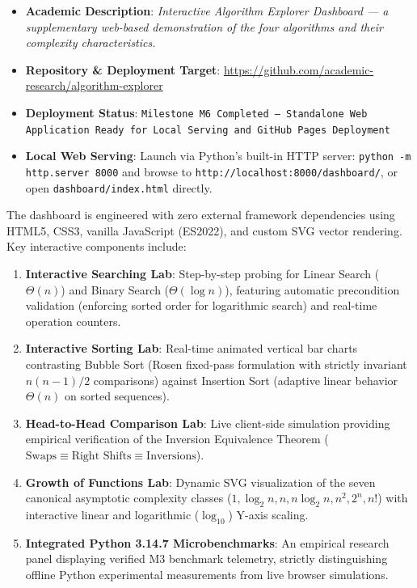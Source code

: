 \documentclass[11pt,a4paper,oneside]{report}
\newcommand{\DocDashboardURL}{https://github.com/academic-research/algorithm-explorer}
\newcommand{\DocDashboardStatus}{Milestone M6 Completed --- Standalone Web Application Ready for Local Serving and GitHub Pages Deployment}
\theoremstyle{definition}
\begin{document}
\begin{itemize}
    \item \textbf{Academic Description}: \emph{Interactive Algorithm Explorer Dashboard --- a supplementary web-based demonstration of the four algorithms and their complexity characteristics.}
    \item \textbf{Repository \& Deployment Target}: \url{\DocDashboardURL}
    \item \textbf{Deployment Status}: \texttt{\DocDashboardStatus}
    \item \textbf{Local Web Serving}: Launch via Python's built-in HTTP server: \texttt{python -m http.server 8000} and browse to \texttt{http://localhost:8000/dashboard/}, or open \texttt{dashboard/index.html} directly.
\end{itemize}

The dashboard is engineered with zero external framework dependencies using HTML5, CSS3, vanilla JavaScript (ES2022), and custom SVG vector rendering. Key interactive components include:
\begin{enumerate}
    \item \textbf{Interactive Searching Lab}: Step-by-step probing for Linear Search ($\Theta(n)$) and Binary Search ($\Theta(\log n)$), featuring automatic precondition validation (enforcing sorted order for logarithmic search) and real-time operation counters.
    \item \textbf{Interactive Sorting Lab}: Real-time animated vertical bar charts contrasting Bubble Sort (Rosen fixed-pass formulation with strictly invariant $n(n-1)/2$ comparisons) against Insertion Sort (adaptive linear behavior $\Theta(n)$ on sorted sequences).
    \item \textbf{Head-to-Head Comparison Lab}: Live client-side simulation providing empirical verification of the Inversion Equivalence Theorem ($\text{Swaps} \equiv \text{Right Shifts} \equiv \text{Inversions}$).
    \item \textbf{Growth of Functions Lab}: Dynamic SVG visualization of the seven canonical asymptotic complexity classes ($1, \log_2 n, n, n \log_2 n, n^2, 2^n, n!$) with interactive linear and logarithmic ($\log_{10}$) Y-axis scaling.
    \item \textbf{Integrated Python 3.14.7 Microbenchmarks}: An empirical research panel displaying verified M3 benchmark telemetry, strictly distinguishing offline Python experimental measurements from live browser simulations.
\end{enumerate}
\end{document}
